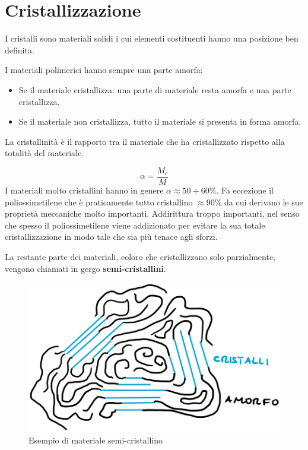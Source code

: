 \chapter{Cristallizzazione}\label{chp:Cristallizzazione}
I cristalli sono materiali solidi i cui elementi costituenti hanno una posizione ben definita.

I materiali polimerici hanno sempre una parte amorfa:
\begin{itemize}
\item Se il materiale cristallizza: una parte di materiale resta amorfa e una parte cristallizza.
\item Se il materiale non cristallizza, tutto il materiale si presenta in forma amorfa. 
\end{itemize}
La cristallinità è il rapporto tra il materiale che ha cristallizzato rispetto alla totalità del materiale.

\begin{equation}
\alpha = \frac{M_c}{M}
\label{eqn:Cristallinità}
\end{equation}
I materiali molto cristallini hanno in genere $\alpha \approx 50 \div 60 \%$.
Fa eccezione il poliossimetilene che è praticamente tutto cristallino $\approx 90\%$ da cui derivano le sue proprietà meccaniche molto importanti. Addirittura troppo importanti, nel senso che spesso il poliossimetilene viene addizionato per evitare la sua totale cristallizzazione in modo tale che sia più tenace agli sforzi.

La restante parte dei materiali, coloro che cristallizzano solo parzialmente, vengono chiamati in gergo \textbf{semi-cristallini}.

\begin{figure}
\centering
\includegraphics[width = \textwidth]{gfx/Cristallinita}
\caption{Esempio di materiale semi-cristallino}
\label{fig:Cristallinita}
\end{figure}

